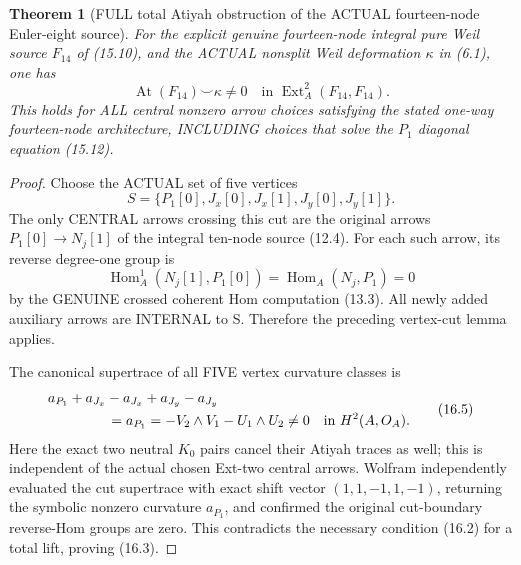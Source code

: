 \documentclass[11pt,a4paper]{article}
\newtheorem{theorem}{Theorem}[section]
\begin{document}
\begin{theorem}[FULL total Atiyah obstruction of the ACTUAL fourteen-node Euler-eight source]
For the
explicit genuine
fourteen-node
integral pure
Weil source
\(F_{14}\)
of (15.10),
and the
ACTUAL nonsplit
Weil deformation
\(\kappa\) in
(6.1), one has
\[
 \boxed{
  \operatorname{At}(F_{14})
           \smile\kappa
       \ne0
 \quad\text{in }
  \operatorname{Ext}^2_A(F_{14},F_{14}) .
 }                                                       \tag{16.3}
\]
This holds for
ALL central
nonzero arrow
choices satisfying
the stated
one-way
fourteen-node
architecture,
INCLUDING choices
that solve the
\(P_1\)
diagonal
equation (15.12).
\end{theorem}
\begin{proof}
Choose the
ACTUAL set
of five
vertices
\[
 \boxed{
 S=\{P_1[0],
       J_x[0],J_x[1],
       J_y[0],J_y[1]\}.
 }                                                       \tag{16.4}
\]
The only
CENTRAL
arrows crossing
this cut
are the
original
arrows
\(P_1[0]\to
 N_j[1]\)
of the
integral
ten-node
source (12.4).
For each such
arrow, its
reverse
degree-one
group is
\[
 \operatorname{Hom}^{1}_A
      (N_j[1],P_1[0])
   =\operatorname{Hom}_A(N_j,P_1)
   =0
\]
by the GENUINE
crossed coherent
Hom computation
(13.3).
All newly
added auxiliary
arrows are
INTERNAL to S.
Therefore
the preceding
vertex-cut
lemma applies.

The canonical
supertrace
of all FIVE
vertex curvature
classes is
\[
 \begin{aligned}
 &a_{P_1}
 +a_{J_x}-a_{J_x}
 +a_{J_y}-a_{J_y}\\
 &\hspace{15mm}
 =a_{P_1}
 =-V_2\wedge V_1
       -U_1\wedge U_2
 \ne0
       \quad\text{in }H^2(A,O_A).
 \end{aligned}                                           \tag{16.5}
\]
Here the exact
two neutral
\(K_0\) pairs
cancel their
Atiyah traces
as well;
this is
independent of
the actual
chosen
Ext-two
central arrows.
Wolfram
independently
evaluated
the cut
supertrace
with exact
shift vector
\((1,1,-1,1,-1)\),
returning the
symbolic
nonzero curvature
\(a_{P_1}\),
and confirmed
the original
cut-boundary
reverse-Hom
groups are zero.
This contradicts
the necessary
condition (16.2)
for a total
lift, proving
(16.3).
\end{proof}
\end{document}
